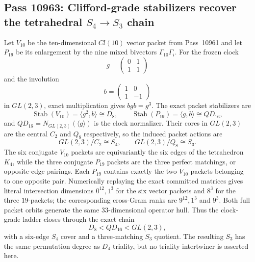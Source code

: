 \subsection{Pass 10963: Clifford-grade stabilizers recover the tetrahedral $S_4\to S_3$ chain}

Let $V_{10}$ be the ten-dimensional $Cl(10)$ vector packet from
Pass~10961 and let $P_{19}$ be its enlargement by the nine mixed
bivectors $\Gamma_{10}\Gamma_i$.  For the frozen clock
\[
g=\begin{pmatrix}0&1\\1&1\end{pmatrix}
\]
and the involution
\[
b=\begin{pmatrix}1&0\\1&-1\end{pmatrix}
\]
in $GL(2,3)$, exact multiplication gives $bgb=g^3$.
The exact packet stabilizers are
\[
\operatorname{Stab}(V_{10})=\langle g^2,b\rangle\cong D_8,
\qquad
\operatorname{Stab}(P_{19})=\langle g,b\rangle\cong QD_{16},
\]
and $QD_{16}=N_{GL(2,3)}(\langle g\rangle)$ is the clock normalizer.
Their cores in $GL(2,3)$ are the central $C_2$ and $Q_8$ respectively,
so the induced packet actions are
\[
GL(2,3)/C_2\cong S_4,\qquad GL(2,3)/Q_8\cong S_3.
\]
The six conjugate $V_{10}$ packets are equivariantly the six edges of
the tetrahedron $K_4$, while the three conjugate $P_{19}$ packets are
the three perfect matchings, or opposite-edge pairings.  Each $P_{19}$
contains exactly the two $V_{10}$ packets belonging to one opposite
pair.  Numerically replaying the exact committed matrices gives
literal intersection dimensions $0^{12},1^3$ for the six vector
packets and $8^3$ for the three $19$-packets; the corresponding
cross-Gram ranks are $9^{12},1^3$ and $9^3$.
Both full packet orbits generate the same $33$-dimensional operator
hull.  Thus the clock-grade ladder closes through the exact chain
\[
D_8< QD_{16}<GL(2,3),
\]
with a six-edge $S_4$ cover and a three-matching $S_3$ quotient.
The resulting $S_3$ has the same permutation degree as $D_4$ triality,
but no triality intertwiner is asserted here.
